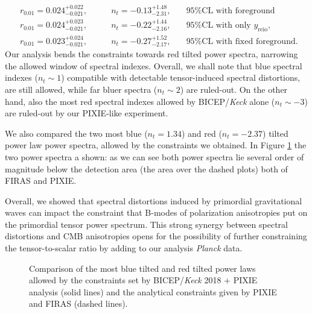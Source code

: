 \begin{align*}
    &r_{0.01}=0.024^{+0.022}_{-0.021} ,\qquad &n_t=-0.13^{+1.48}_{-2.31},\quad &\text{95\%CL with foreground }\\
    &r_{0.01}=0.024^{+0.023}_{-0.021} ,\qquad &n_t=-0.22^{+1.44}_{-2.16},\quad &\text{95\%CL with only }y_\text{reio},\\
    &r_{0.01}=0.023^{+0.024}_{-0.021} ,\qquad &n_t=-0.27^{+1.52}_{-2.17},\quad &\text{95\%CL with fixed foreground. }
\end{align*}
Our analysis bends the constraints towards red tilted power spectra, narrowing the allowed window of spectral indexes. Overall, we shall note that blue spectral indexes ($n_t\sim1$) compatible with detectable tensor-induced spectral distortions, are still allowed, while far bluer spectra ($n_t\sim2$) are ruled-out. On the other hand, also the most red spectral indexes allowed by BICEP/\emph{Keck} alone ($n_t\sim-3$) are ruled-out by our PIXIE-like experiment.

We also compared the two most blue ($n_t=1.34$) and red ($n_t=-2.37$) tilted power law power spectra, allowed by the constraints we obtained. In Figure \ref{fig:analy_const_BK18} the two power spectra a shown: as we can see both power spectra lie several order of magnitude below the detection area (the area over the dashed plots) both of FIRAS and PIXIE.

Overall, we showed that spectral distortions induced by primordial gravitational waves can impact the constraint that B-modes of polarization anisotropies put on the primordial tensor power spectrum.
This strong synergy between spectral distortions and CMB anisotropies opens for the possibility of further constraining the tensor-to-scalar ratio by adding to our analysis \textit{Planck} data. 
\begin{figure}
    \centering
{}
\caption{Comparison of the most blue tilted and red tilted power laws allowed  by the constraints set by BICEP/\emph{Keck} 2018 + PIXIE analysis (solid lines) and the analytical constraints given by PIXIE and FIRAS (dashed lines).}
\label{fig:analy_const_BK18}
\end{figure}
